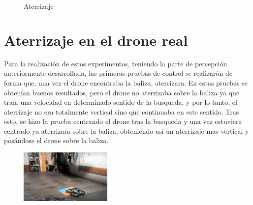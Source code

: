 \begin{figure}[H]
 \centering
 \caption{Aterrizaje}
 \label{f:Test aterrizaje}
\end{figure}

\section{Aterrizaje en el drone real}
\hspace{1cm} Para la realizaci\'on de estos experimentos, teniendo la parte de percepci\'on anteriormente desarrollada, las primeras pruebas de control se realizar\'on de forma que, una vez el drone encontraba la baliza, aterrizara. En estas pruebas se obten\'ian buenos resultados, pero el drone no aterrizaba sobre la baliza ya que tra\'ia una velocidad en determinado sentido de la busqueda, y por lo tanto, el aterrizaje no era totalmente vertical sino que continuaba en este sentido. Tras esto, se hizo la prueba centrando el drone tras la busqueda y una vez estuviera centrado ya aterrizara sobre la baliza, obteniendo as\'i un aterrizaje mas vertical y pos\'andose el drone sobre la baliza. 
\begin{figure}[H]
	\centering
		\includegraphics[width=0.4\textwidth]{imgs/landed_real.jpg}
	\label{fig:Aterrizaje sobre la baliza real.}
\end{figure}


